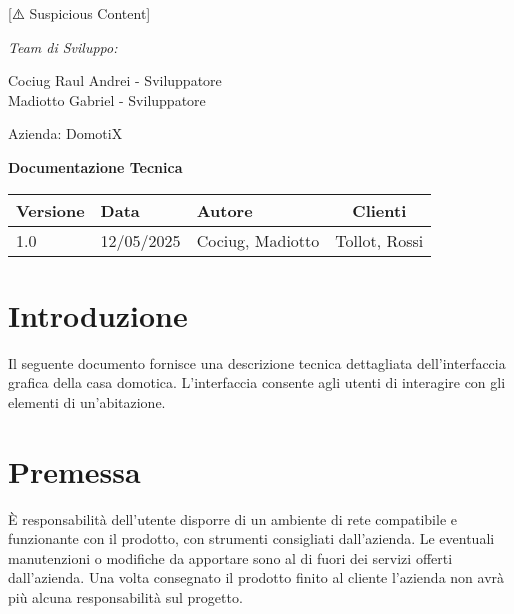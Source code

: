 [⚠️ Suspicious Content] \documentclass[a4paper,12pt]{article}
\begin{document}
\begin{titlepage}
    \begin{minipage}[t]{0.4\textwidth}
    \raggedright
    {\large\itshape Team di Sviluppo:\par}
    \vspace{0.2cm}
    
    Cociug Raul Andrei - Sviluppatore \\
    Madiotto Gabriel - Sviluppatore
    \end{minipage}
    \hfill
    \begin{minipage}[t]{0.4\textwidth}
    \raggedleft
    {\Large Azienda: DomotiX\par}
    \end{minipage}
    
    \centering
    \vspace*{5cm}
    
    {\Huge\bfseries Documentazione Tecnica\par}
    
    \vfill
    
    \begin{table}[h]
    \centering
    \begin{tabular}{@{}lllc@{}}
    \toprule
    Versione & Data & Autore & Clienti \\  
    \midrule
    1.0 & 12/05/2025 & Cociug, Madiotto & Tollot, Rossi \\
    \bottomrule
    \end{tabular}
    \end{table}
    
    \thispagestyle{empty}
\end{titlepage}

\tableofcontents
\newpage

\section{Introduzione}

Il seguente documento fornisce una descrizione tecnica dettagliata dell'interfaccia grafica della casa domotica. L’interfaccia consente agli utenti di interagire con gli elementi di un’abitazione.

\section{Premessa}

È responsabilità dell’utente disporre di un ambiente di rete compatibile e funzionante con il prodotto, con strumenti consigliati dall'azienda. Le eventuali manutenzioni o modifiche da apportare sono al di fuori dei servizi offerti dall'azienda. Una volta consegnato il prodotto finito al cliente l'azienda non avrà più alcuna responsabilità sul progetto.
\end{document}
